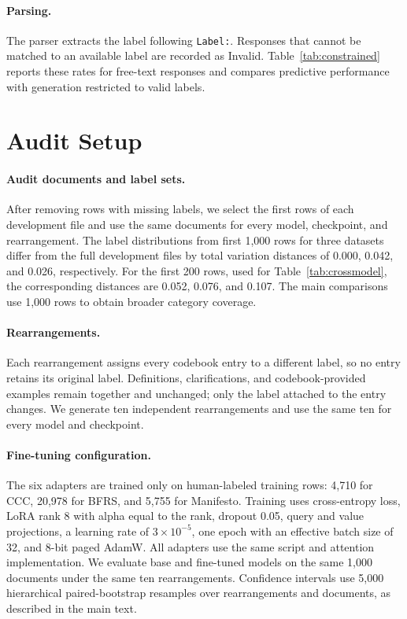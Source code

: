 \documentclass[11pt]{article}
\begin{document}
\paragraph{Parsing.}
The parser extracts the label following \texttt{Label:}. Responses that cannot be matched to an available label are recorded as Invalid. Table~\ref{tab:constrained} reports these rates for free-text responses and compares predictive performance with generation restricted to valid labels.

\section{Audit Setup}
\label{app:audit}

\paragraph{Audit documents and label sets.}
After removing rows with missing labels, we select the first rows of each development file and use the same documents for every model, checkpoint, and rearrangement. The label distributions from first 1,000 rows for three datasets differ from the full development files by total variation distances of 0.000, 0.042, and 0.026, respectively. For the first 200 rows, used for Table~\ref{tab:crossmodel}, the corresponding distances are 0.052, 0.076, and 0.107. The main comparisons use 1,000 rows to obtain broader category coverage. 

\paragraph{Rearrangements.}
Each rearrangement assigns every codebook entry to a different label, so no entry retains its original label. Definitions, clarifications, and codebook-provided examples remain together and unchanged; only the label attached to the entry changes. We generate ten independent rearrangements and use the same ten for every model and checkpoint.

\paragraph{Fine-tuning configuration.}
The six adapters are trained only on human-labeled training rows: 4,710 for CCC, 20,978 for BFRS, and 5,755 for Manifesto. Training uses cross-entropy loss, LoRA rank 8 with alpha equal to the rank, dropout 0.05, query and value projections, a learning rate of $3\times10^{-5}$, one epoch with an effective batch size of 32, and 8-bit paged AdamW. All adapters use the same script and attention implementation. We evaluate base and fine-tuned models on the same 1,000 documents under the same ten rearrangements. Confidence intervals use 5,000 hierarchical paired-bootstrap resamples over rearrangements and documents, as described in the main text.
\end{document}

